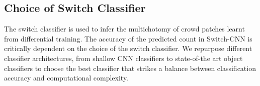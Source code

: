 \documentclass[10pt,twocolumn,letterpaper]{article}
\begin{document}
\subsection{Choice of Switch Classifier}
The switch classifier is used to infer the multichotomy of crowd patches learnt from differential training. The accuracy of the predicted count in Switch-CNN is critically dependent on the choice of the switch classifier. We repurpose different classifier architectures, from shallow CNN classifiers to state-of-the art object classifiers to choose the best classifier that strikes a balance between classification accuracy and computational complexity.

\begin{table}[!t]
\begin{centering}

\par\end{centering}
\vspace*{1.2mm}
\caption{Comparison of classification accuracy for different switch architectures on Part A of the ShanghaiTech dataset~\cite{zhang2016single}. The final switch-classifier selected for all Switch-CNN experiments is highlighted in \textcolor{red}{red}. }
\label{t2}
\end{table}
\end{document}
